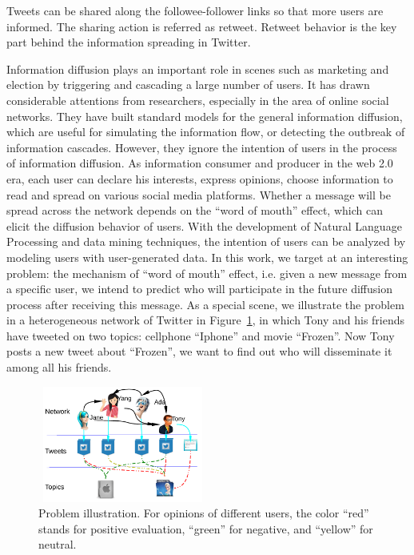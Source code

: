 \documentclass[letterpaper]{article}
\begin{document}
Tweets can be shared along the followee-follower links so that more users are informed. The sharing action is referred as retweet. Retweet behavior is the key part behind the information spreading in Twitter.



\noindent Information diffusion plays an important role in scenes such as marketing and election by triggering and cascading a large number of users. It has drawn considerable attentions from researchers, especially in the area of online social networks. They have built standard models for the general information diffusion, which are useful for simulating the information flow\cite{goldenberg2001talk,kempe2003maximizing}, or detecting the outbreak of information cascades\cite{cheng2014can}. However, they ignore the intention of users in the process of information diffusion. As information consumer and producer in the web 2.0 era, each user can declare his interests, express opinions, choose information to read and spread on various social media platforms. Whether a message will be spread across the network depends on the ``word of mouth'' effect, which can elicit the diffusion behavior of users. With the development of Natural Language Processing and data mining techniques, the intention of users can be analyzed by modeling users with user-generated data. In this work, we target at an interesting problem: the mechanism of ``word of mouth'' effect, i.e. given a new message from a specific user, we intend to predict who will participate in the future diffusion process after receiving this message. 
As a special scene, we illustrate the problem in a heterogeneous network of Twitter in Figure~\ref{fig00}, in which Tony and his friends have tweeted on two topics: cellphone ``Iphone'' and movie ``Frozen''. Now Tony posts a new tweet about ``Frozen'', we want to find out who will disseminate it among all his friends.
\begin{figure}[htb]
\centering
\includegraphics[width=2.2in,height=1.5in]{Mexample.pdf}
\caption{Problem illustration. For opinions of different users, the color ``red'' stands for positive evaluation, ``green'' for negative, and ``yellow'' for neutral.}
\label{fig00}
\end{figure}
\end{document}
